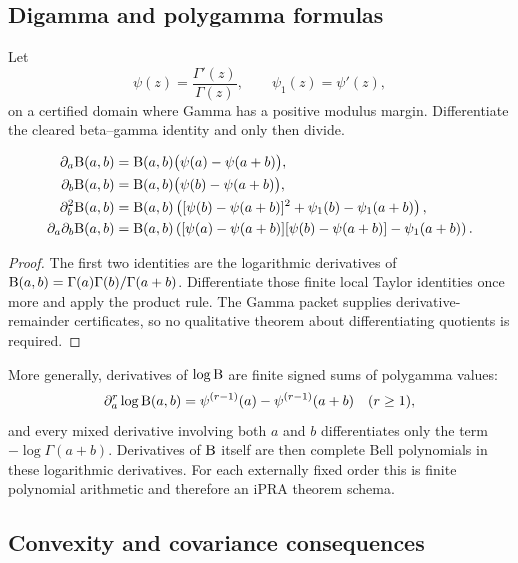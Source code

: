 \subsection{Digamma and polygamma formulas}

Let
\[
 \psi(z)=\frac{\Gamma'(z)}{\Gamma(z)},
 \qquad
 \psi_1(z)=\psi'(z),
\]
on a certified domain where Gamma has a positive modulus margin.  Differentiate the cleared beta--gamma identity and only then divide.

\begin{theorem}\label{thm:digamma-beta}
\begin{align*}
 \partial_a\mathrm B(a,b)
 &=\mathrm B(a,b)\bigl(\psi(a)-\psi(a+b)\bigr),\\
 \partial_b\mathrm B(a,b)
 &=\mathrm B(a,b)\bigl(\psi(b)-\psi(a+b)\bigr),\\
 \partial_b^2\mathrm B(a,b)
 &=\mathrm B(a,b)\left(
   [\psi(b)-\psi(a+b)]^2+
   \psi_1(b)-\psi_1(a+b)\right),\\
 \partial_a\partial_b\mathrm B(a,b)
 &=\mathrm B(a,b)\left(
   [\psi(a)-\psi(a+b)]
   [\psi(b)-\psi(a+b)]
   -\psi_1(a+b)\right).
\end{align*}
\end{theorem}

\begin{proof}
The first two identities are the logarithmic derivatives of
$\mathrm B(a,b)=\Gamma(a)\Gamma(b)/\Gamma(a+b)$.  Differentiate those finite local Taylor identities once more and apply the product rule.  The Gamma packet supplies derivative-remainder certificates, so no qualitative theorem about differentiating quotients is required.
\end{proof}

More generally, derivatives of $\log\mathrm B$ are finite signed sums of polygamma values:
\[
 \partial_a^r\log\mathrm B(a,b)
 =\psi^{(r-1)}(a)-\psi^{(r-1)}(a+b)
 \quad(r\ge1),
\]
and every mixed derivative involving both $a$ and $b$ differentiates only the term $-\log\Gamma(a+b)$.  Derivatives of $\mathrm B$ itself are then complete Bell polynomials in these logarithmic derivatives.  For each externally fixed order this is finite polynomial arithmetic and therefore an iPRA theorem schema.

\subsection{Convexity and covariance consequences}

